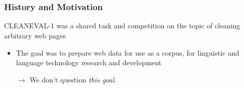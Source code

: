 \section*{}
\subsection*{}


\begin{frame}
	\frametitle{History and Motivation}
		
		CLEANEVAL-1 was a shared task and competition on the topic of cleaning arbitrary web pages
		
	\begin{block}{}	
		\begin{itemize}
			\item The goal was to prepare web data for use as a corpus, for linguistic and language technology research and development
			\pause
			\item[$\rightarrow$] We don't question \emph{this goal}.
		\end{itemize}
	\end{block}
\end{frame}

